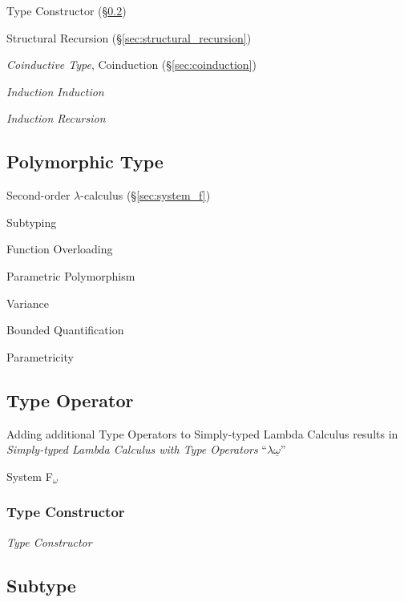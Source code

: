 Type Constructor (\S\ref{sec:type_operator})

Structural Recursion (\S\ref{sec:structural_recursion})

\emph{Coinductive Type}, Coinduction (\S\ref{sec:coinduction})

\emph{Induction Induction}

\emph{Induction Recursion}



\subsection{Polymorphic Type}\label{sec:polymorphic_type}

Second-order $\lambda$-calculus (\S\ref{sec:system_f})

Subtyping

Function Overloading

Parametric Polymorphism

Variance

Bounded Quantification

Parametricity



\subsection{Type Operator}\label{sec:type_operator}

Adding additional Type Operators to Simply-typed Lambda Calculus
results in \emph{Simply-typed Lambda Calculus with Type Operators}
``$\lambda \underline{\omega}$''

System F$_{\omega}$



\subsubsection{Type Constructor}\label{sec:type_constructor}

\emph{Type Constructor}



\subsection{Subtype}\label{sec:subtype}

